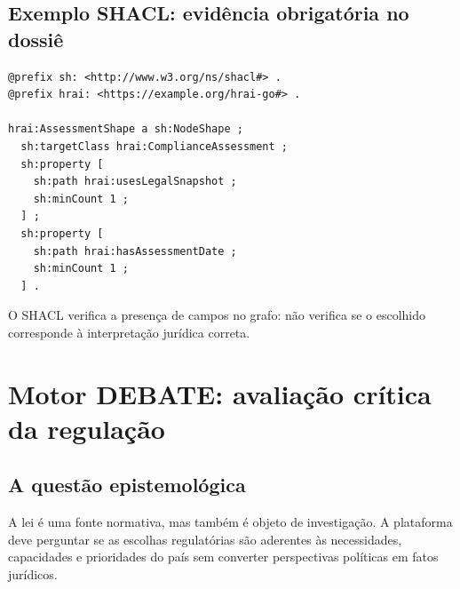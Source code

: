 \documentclass[12pt,a4paper,oneside,english,brazil]{abntex2}
\newcommand{\term}[1]{{\mdseries\ttfamily\small\seqsplit{#1}}}
\begin{document}
\section{Exemplo SHACL: evidência obrigatória no dossiê}
\begin{lstlisting}
@prefix sh: <http://www.w3.org/ns/shacl#> .
@prefix hrai: <https://example.org/hrai-go#> .

hrai:AssessmentShape a sh:NodeShape ;
  sh:targetClass hrai:ComplianceAssessment ;
  sh:property [
    sh:path hrai:usesLegalSnapshot ;
    sh:minCount 1 ;
  ] ;
  sh:property [
    sh:path hrai:hasAssessmentDate ;
    sh:minCount 1 ;
  ] .
\end{lstlisting}
O SHACL verifica a presença de campos no grafo: não verifica se o \term{LegalSnapshot} escolhido corresponde à interpretação jurídica correta.

\chapter{Motor DEBATE: avaliação crítica da regulação}
\section{A questão epistemológica}
A lei é uma fonte normativa, mas também é objeto de investigação. A plataforma deve perguntar se as escolhas regulatórias são aderentes às necessidades, capacidades e prioridades do país sem converter perspectivas políticas em fatos jurídicos.
\end{document}
